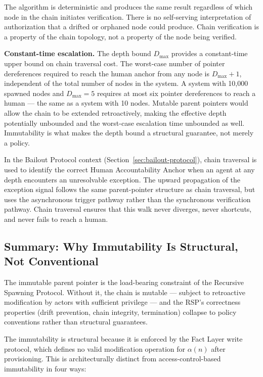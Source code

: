 The algorithm is deterministic and produces the same result regardless of which node in the chain initiates verification. There is no self-serving interpretation of authorization that a drifted or orphaned node could produce. Chain verification is a property of the chain topology, not a property of the node being verified.

\medskip
\noindent\textbf{Constant-time escalation.} The depth bound $D_{\max}$ provides a constant-time upper bound on chain traversal cost. The worst-case number of pointer dereferences required to reach the human anchor from any node is $D_{\max} + 1$, independent of the total number of nodes in the system. A system with 10,000 spawned nodes and $D_{\max} = 5$ requires at most six pointer dereferences to reach a human — the same as a system with 10 nodes. Mutable parent pointers would allow the chain to be extended retroactively, making the effective depth potentially unbounded and the worst-case escalation time unbounded as well. Immutability is what makes the depth bound a structural guarantee, not merely a policy.

In the Bailout Protocol context (Section~\ref{sec:bailout-protocol}), chain traversal is used to identify the correct Human Accountability Anchor when an agent at any depth encounters an unresolvable exception. The upward propagation of the exception signal follows the same parent-pointer structure as chain traversal, but uses the asynchronous trigger pathway rather than the synchronous verification pathway. Chain traversal ensures that this walk never diverges, never shortcuts, and never fails to reach a human.

\subsection{Summary: Why Immutability Is Structural, Not Conventional}
\label{sec:immutability-structural-summary}

The immutable parent pointer is the load-bearing constraint of the Recursive Spawning Protocol. Without it, the chain is mutable — subject to retroactive modification by actors with sufficient privilege — and the RSP's correctness properties (drift prevention, chain integrity, termination) collapse to policy conventions rather than structural guarantees.

The immutability is structural because it is enforced by the Fact Layer write protocol, which defines no valid modification operation for $\alpha(n)$ after provisioning. This is architecturally distinct from access-control-based immutability in four ways:

